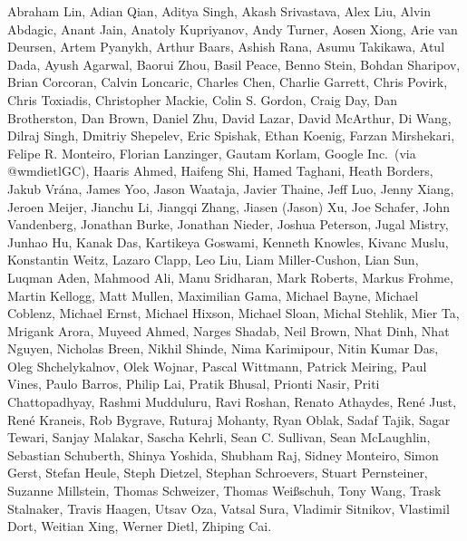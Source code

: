 Abraham Lin,
Adian Qian,
Aditya Singh,
Akash Srivastava,
Alex Liu,
Alvin Abdagic,
Anant Jain,
Anatoly Kupriyanov,
Andy Turner,
Aosen Xiong,
Arie van Deursen,
Artem Pyanykh,
Arthur Baars,
Ashish Rana,
Asumu Takikawa,
Atul Dada,
Ayush Agarwal,
Baorui Zhou,
Basil Peace,
Benno Stein,
Bohdan Sharipov,
Brian Corcoran,
Calvin Loncaric,
Charles Chen,
Charlie Garrett,
Chris Povirk,
Chris Toxiadis,
Christopher Mackie,
Colin S. Gordon,
Craig Day,
Dan Brotherston,
Dan Brown,
Daniel Zhu,
David Lazar,
David McArthur,
Di Wang,
Dilraj Singh,
Dmitriy Shepelev,
Eric Spishak,
Ethan Koenig,
Farzan Mirshekari,
Felipe R. Monteiro,
Florian Lanzinger,
Gautam Korlam,
Google Inc.\ (via @wmdietlGC),
Haaris Ahmed,
Haifeng Shi,
Hamed Taghani,
Heath Borders,
Jakub Vr\'ana,
James Yoo,
Jason Waataja,
Javier Thaine,
Jeff Luo,
Jenny Xiang,
Jeroen Meijer,
Jianchu Li,
Jiangqi Zhang,
Jiasen (Jason) Xu,
Joe Schafer,
John Vandenberg,
Jonathan Burke,
Jonathan Nieder,
Joshua Peterson,
Jugal Mistry,
Junhao Hu,
Kanak Das,
Kartikeya Goswami,
Kenneth Knowles,
Kivanc Muslu,
Konstantin Weitz,
Lazaro Clapp,
Leo Liu,
Liam Miller-Cushon,
Lian Sun,
Luqman Aden,
Mahmood Ali,
Manu Sridharan,
Mark Roberts,
Markus Frohme,
Martin Kellogg,
Matt Mullen,
Maximilian Gama,
Michael Bayne,
Michael Coblenz,
Michael Ernst,
Michael Hixson,
Michael Sloan,
Michal Stehlik,
Mier Ta,
Mrigank Arora,
Muyeed Ahmed,
Narges Shadab,
Neil Brown,
Nhat Dinh,
Nhat Nguyen,
Nicholas Breen,
Nikhil Shinde,
Nima Karimipour,
Nitin Kumar Das,
Oleg Shchelykalnov,
Olek Wojnar,
Pascal Wittmann,
Patrick Meiring,
Paul Vines,
Paulo Barros,
Philip Lai,
Pratik Bhusal,
Prionti Nasir,
Priti Chattopadhyay,
Rashmi Mudduluru,
Ravi Roshan,
Renato Athaydes,
Ren\'e Just,
Ren\'e Kraneis,
Rob Bygrave,
Ruturaj Mohanty,
Ryan Oblak,
Sadaf Tajik,
Sagar Tewari,
Sanjay Malakar,
Sascha Kehrli,
Sean C. Sullivan,
Sean McLaughlin,
Sebastian Schuberth,
Shinya Yoshida,
Shubham Raj,
Sidney Monteiro,
Simon Gerst,
Stefan Heule,
Steph Dietzel,
Stephan Schroevers,
Stuart Pernsteiner,
Suzanne Millstein,
Thomas Schweizer,
Thomas Wei\ss schuh,
Tony Wang,
Trask Stalnaker,
Travis Haagen,
Utsav Oza,
Vatsal Sura,
Vladimir Sitnikov,
Vlastimil Dort,
Weitian Xing,
Werner Dietl,
Zhiping Cai.
